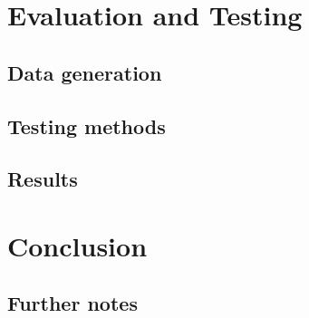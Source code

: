 \documentclass[11pt,a4paper]{vutinfth}
\newcommand{\change}[1]{\textcolor{red}{#1}}
\begin{document}






\chapter{Evaluation and Testing}

\section{Data generation} %

\section{Testing methods}

\section{Results}

\chapter{Conclusion}

\section{Further notes}





\backmatter %



\end{document}
